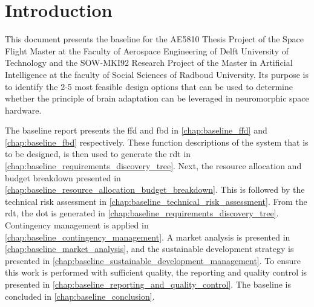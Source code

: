 \chapter{Introduction}\label{chap:baseline_introduction}
This document presents the baseline for the AE5810 Thesis Project of the Space Flight Master at the Faculty of Aerospace Engineering of Delft University of Technology and the SOW-MKI92 Research Project of the Master in Artificial Intelligence at the faculty of Social Sciences of Radboud University. Its purpose is to identify the 2-5 most feasible design options that can be used to determine whether the principle of brain adaptation can be leveraged in neuromorphic space hardware.


The baseline report presents the \acrfull{ffd} and \acrfull{fbd} in \cref{chap:baseline_ffd} and \cref{chap:baseline_fbd} respectively. These function descriptions of the system that is to be designed, is then used to generate the \acrfull{rdt} in \cref{chap:baseline_requirements_discovery_tree}. Next, the resource allocation and budget breakdown presented in \cref{chap:baseline_resource_allocation_budget_breakdown}. This is followed by the technical risk assessment in \cref{chap:baseline_technical_risk_assessment}. From the \acrshort{rdt}, the \acrfull{dot} is generated in \cref{chap:baseline_requirements_discovery_tree}. Contingency management is applied in \cref{chap:baseline_contingency_management}. A market analysis is presented in \cref{chap:baseline_market_analysis}, and the sustainable development strategy is presented in \cref{chap:baseline_sustainable_development_management}. To ensure this work is performed with sufficient quality, the reporting and quality control is presented in \cref{chap:baseline_reporting_and_quality_control}. The baseline is concluded in \cref{chap:baseline_conclusion}.